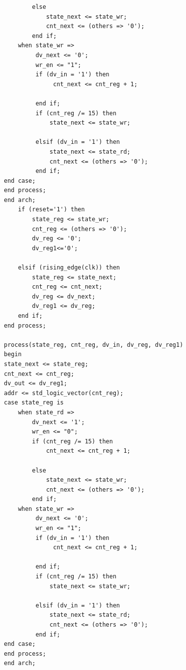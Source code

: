 \begin{Code}
\begin{lstlisting}
        else
            state_next <= state_wr;
            cnt_next <= (others => '0');
        end if;
    when state_wr =>
         dv_next <= '0';
         wr_en <= "1";
         if (dv_in = '1') then
              cnt_next <= cnt_reg + 1;
         
         end if;     
         if (cnt_reg /= 15) then
             state_next <= state_wr;
 
         elsif (dv_in = '1') then
             state_next <= state_rd;
             cnt_next <= (others => '0'); 
         end if;      
end case;
end process;
end arch;
    if (reset='1') then
        state_reg <= state_wr;
        cnt_reg <= (others => '0');
        dv_reg <= '0';
        dv_reg1<='0';

    elsif (rising_edge(clk)) then
        state_reg <= state_next;
        cnt_reg <= cnt_next;
        dv_reg <= dv_next;
        dv_reg1 <= dv_reg;  
    end if;
end process;

process(state_reg, cnt_reg, dv_in, dv_reg, dv_reg1)
begin
state_next <= state_reg;
cnt_next <= cnt_reg;
dv_out <= dv_reg1;
addr <= std_logic_vector(cnt_reg);
case state_reg is
    when state_rd =>
        dv_next <= '1';
        wr_en <= "0"; 
        if (cnt_reg /= 15) then
            cnt_next <= cnt_reg + 1;  
            
        else
            state_next <= state_wr;
            cnt_next <= (others => '0');
        end if;
    when state_wr =>
         dv_next <= '0';
         wr_en <= "1";
         if (dv_in = '1') then
              cnt_next <= cnt_reg + 1;
         
         end if;     
         if (cnt_reg /= 15) then
             state_next <= state_wr;
 
         elsif (dv_in = '1') then
             state_next <= state_rd;
             cnt_next <= (others => '0'); 
         end if;      
end case;
end process;
end arch;
\end{lstlisting}
\end{Code}

